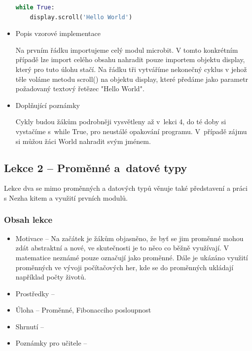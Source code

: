 \documentclass[
  digital,     %
  oneside,     %
  nosansbold,  %
  colorbold, %
  lof,         %
  nolot,         %
]{fithesis4}
\begin{document}
\begin{itemize}
\begin{footnotesize}
\begin{lstlisting}[language=Python, caption=Úloha 1 - Hello World]
while True:
    display.scroll('Hello World')
\end{lstlisting}
\end{footnotesize}
    \item Popis vzorové implementace

Na prvním řádku importujeme celý modul microbit. V tomto konkrétním případě lze import celého obsahu nahradit pouze importem objektu display, který pro tuto úlohu stačí. Na řádku tři vytváříme nekonečný cyklus v jehož těle voláme metodu scroll() na objektu display, které předáme jako parametr požadovaný textový řetězec "Hello World".

    \item Doplňující poznámky

Cykly budou žákům podrobněji vysvětleny až v~lekci 4, do té doby si vystačíme s~while True, pro neustálé opakování programu. V~případě zájmu si můžou žáci World nahradit svým jménem.
\end{itemize}

\subsection{Lekce 2 -- Proměnné a~datové typy}
Lekce dva se mimo proměnných a datových typů věnuje také představení a práci s Nezha kitem a využití prvních modulů.

\subsubsection{Obsah lekce}
\begin{itemize}
    \item Motivace -- Na začátek je žákům objasněno, že byť se jim proměnné mohou zdát abstraktní a nové, ve skutečnosti je to něco co běžně využívají. V matematice neznámé pouze označují jako proměnné. Dále je ukázáno využití proměnných ve vývoji počítačových her, kde se do proměnných ukládají například počty životů.
    \item Prostředky -- 

    \item Úloha -- Proměnné, Fibonacciho posloupnost

    \item Shrnutí --

    \item Poznámky pro učitele -- 
\end{itemize}
\end{document}
